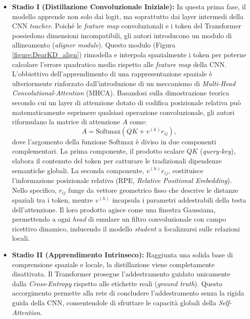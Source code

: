 \begin{itemize}
    \item \textbf{Stadio I (Distillazione Convoluzionale Iniziale):} In questa prima fase, il modello apprende non solo dai logit, ma soprattutto dai layer intermedi della CNN \textit{teacher}. Poiché le \textit{feature map} convoluzionali e i token del Transformer possiedono dimensioni incompatibili, gli autori introducono un modulo di allineamento (\textit{aligner module}). Questo modulo (Figura \ref{figure:DearKD_align}) rimodella e interpola spazialmente i token per poterne calcolare l'errore quadratico medio rispetto alle \textit{feature map} della CNN.
          L'obbiettivo dell'apprendimento di una rappresentazione spaziale è ulteriormente rinforzato dall'introduzione di un meccanismo di \textit{Multi-Head Convolutional-Attention} (MHCA). Basandosi sulla dimostrazione teorica \cite{cordonnier2020relationshipselfattentionconvolutionallayers} secondo cui un layer di attenzione dotato di codifica posizionale relativa può matematicamente esprimere qualsiasi operazione convoluzionale, gli autori riformulano la matrice di attenzione $A$ come:
          \begin{equation}
              A = \text{Softmax}(QK + v^{(h)}r_{ij}),
          \end{equation}
          dove l'argomento della funzione Softmax è diviso in due componenti complementari. La prima componente, il prodotto scalare $QK$ (\textit{query-key}), elabora il contenuto del token per catturare le tradizionali dipendenze semantiche globali. La seconda componente, $v^{(h)}r_{ij}$, costituisce l'informazione posizionale relativa (RPE, \textit{Relative Positional Embedding}). Nello specifico, $r_{ij}$ funge da vettore geometrico fisso che descrive le distanze spaziali tra i token, mentre $v^{(h)}$ incapsula i parametri addestrabili della testa dell'attenzione. Il loro prodotto agisce come una finestra Gaussiana, permettendo a ogni \textit{head} di emulare un filtro convoluzionale con campo ricettivo dinamico, inducendo il modello \textit{student} a focalizzarsi sulle relazioni locali.

    \item \textbf{Stadio II (Apprendimento Intrinseco):} Raggiunta una solida base di comprensione spaziale e locale, la distillazione viene completamente disattivata. Il Transformer prosegue l'addestramento guidato unicamente dalla \textit{Cross-Entropy} rispetto alle etichette reali (\textit{ground truth}). Questo accorgimento permette alla rete di concludere l'addestramento senza la rigida guida della CNN, consentendole di sfruttare le capacità globali della \textit{Self-Attention}.
\end{itemize}
